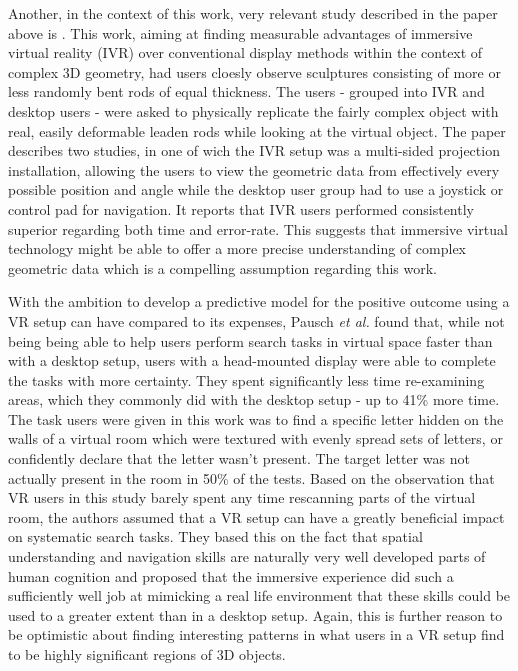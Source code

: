 Another, in the context of this work, very relevant study described in the paper above is \cite{mizell2002comparing}. This work, aiming at finding measurable advantages of immersive virtual reality (IVR) over conventional display methods within the context of complex 3D geometry, had users cloesly observe sculptures consisting of more or less randomly bent rods of equal thickness. The users - grouped into IVR and desktop users - were asked to physically replicate the fairly complex object with real, easily deformable leaden rods while looking at the virtual object. The paper describes two studies, in one of wich the IVR setup was a multi-sided projection installation, allowing the users to view the geometric data from effectively every possible position and angle while the desktop user group had to use a joystick or control pad for navigation. It reports that IVR users performed consistently superior regarding both time and error-rate. This suggests that immersive virtual technology might be able to offer a more precise understanding of complex geometric data which is a compelling assumption regarding this work.

With the ambition to develop a predictive model for the positive outcome using a VR setup can have compared to its expenses, Pausch \textit{et al.} \cite{pausch1997quantifying} found that, while not being being able to help users perform search tasks in virtual space faster than with a desktop setup, users with a head-mounted display were able to complete the tasks with more certainty. They spent significantly less time re-examining areas, which they commonly did with the desktop setup - up to 41\% more time. The task users were given in this work was to find a specific letter hidden on the walls of a virtual room which were textured with evenly spread sets of letters, or confidently declare that the letter wasn't present. The target letter was not actually present in the room in 50\% of the tests. Based on the observation that VR users in this study barely spent any time rescanning parts of the virtual room, the authors assumed that a VR setup can have a greatly beneficial impact on systematic search tasks. They based this on the fact that spatial understanding and navigation skills are naturally very well developed parts of human cognition and proposed that the immersive experience did such a sufficiently well job at mimicking a real life environment that these skills could be used to a greater extent than in a desktop setup. Again, this is further reason to be optimistic about finding interesting patterns in what users in a VR setup find to be highly significant regions of 3D objects.

